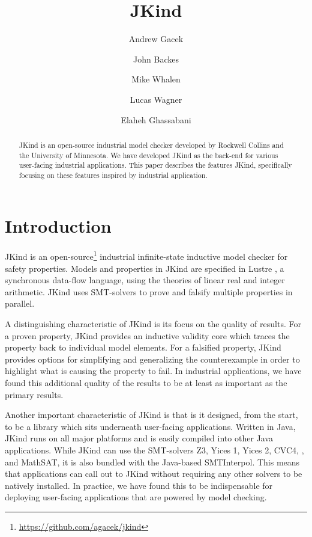 \documentclass{llncs}
\title{JKind}
\author{
  Andrew Gacek\inst{1} \and
  John Backes\inst{2} \and
  Mike Whalen\inst{3} \and
  Lucas Wagner\inst{2} \and
  Elaheh Ghassabani\inst{3}}
\institute{
  Rockwell Collins \\
  \and
  Amazon Web Services \\
  \and
  University of Minnesota
}
\newcommand{\jkind}{{\sc JKind}\xspace}
\newcommand{\lustre}{{\sc Lustre}\xspace}
\begin{document}
\maketitle

\begin{abstract}
  \jkind is an open-source industrial model checker developed by
  Rockwell Collins and the University of Minnesota. We have developed
  \jkind as the back-end for various user-facing industrial
  applications. This paper describes the features \jkind, specifically
  focusing on these features inspired by industrial application.
\end{abstract}

\section{Introduction}

\jkind is an
open-source\footnote{\url{https://github.com/agacek/jkind}} industrial
infinite-state inductive model checker for safety properties. Models
and properties in \jkind are specified in \lustre
\cite{halbwachs1991ieee}, a synchronous data-flow language, using the
theories of linear real and integer arithmetic. \jkind uses
SMT-solvers to prove and falsify multiple properties in parallel.

A distinguishing characteristic of \jkind is its focus on the quality
of results. For a proven property, \jkind provides an inductive
validity core which traces the property back to individual model
elements. For a falsified property, \jkind provides options for
simplifying and generalizing the counterexample in order to highlight
what is causing the property to fail. In industrial applications, we
have found this additional quality of the results to be at least as
important as the primary results.

Another important characteristic of \jkind is that is it designed,
from the start, to be a library which sits underneath user-facing
applications. Written in Java, \jkind runs on all major platforms and
is easily compiled into other Java applications. While \jkind can use
the SMT-solvers {\sc Z3}, {\sc Yices 1}, {\sc Yices 2}, {\sc CVC4}, ,
and {\sc MathSAT}, it is also bundled with the Java-based {\sc
  SMTInterpol}. This means that applications can call out to \jkind
without requiring any other solvers to be natively installed. In
practice, we have found this to be indispensable for deploying
user-facing applications that are powered by model checking.
\end{document}
